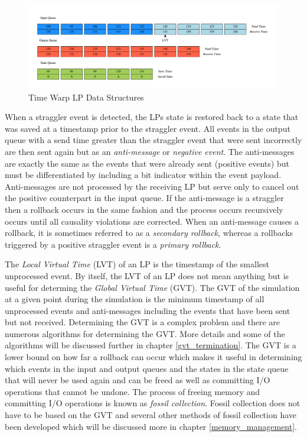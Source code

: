 \documentclass[11pt]{book}
\begin{document}
\begin{figure}
    \centering
    \includegraphics[width=\textwidth,quiet]{figs/graphviz/logical_process.pdf}
    \caption{Time Warp LP Data Structures}\label{lp_data_structures}
\end{figure}

When a straggler event is detected, the LPs state is restored back to a state that was saved
at a timestamp prior to the straggler event. All events in the output queue with a send time
greater than the straggler event that were sent incorrectly are then sent again but as an
\emph{anti-message} or \emph{negative event}. The anti-messages are exactly the same as the
events that were already sent (positive events) but must be differentiated by including a bit
indicator within the event payload. Anti-messages are not processed by the receiving LP but
serve only to cancel out the positive counterpart in the input queue. If the anti-message is
a straggler then a rollback occurs in the same fashion and the process occurs recursively
occurs until all causality violations are corrected. When an anti-message causes a rollback,
it is sometimes referred to as a \emph{secondary rollback}, whereas a rollbacks triggered by
a positive straggler event is a \emph{primary rollback}.

The \emph{Local Virtual Time} (LVT) of an LP is the timestamp of the smallest unprocessed event.
By itself, the LVT of an LP does not mean anything but is useful for determing the 
\emph{Global Virtual Time} (GVT). The GVT of the simulation at a given point during the simulation
is the minimum timestamp of all unprocessed events and anti-messages including the events that
have been sent but not received\cite{fujimoto-94}. Determining the GVT is a complex problem
and there are numerous algorithms for determining the GVT. More details and some of the
algorithms will be discussed further in chapter \ref{gvt_termination}. The GVT is a lower
bound on how far a rollback can occur which makes it useful in determining which events in the
input and output queues and the states in the state queue that will never be used again and can
be freed as well as committing I/O operations that cannot be undone. The process of freeing
memory and committing I/O operations is known as \emph{fossil collection}. Fossil collection
does not have to be based on the GVT and several other methods of fossil collection have been
developed which will be discussed more in chapter \ref{memory_management}.
\end{document}
